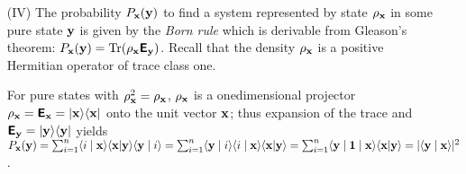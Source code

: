 {\begin{itemize}
{ist, da\ss~ diese zweite Art von Ver\"anderung der $\psi$-Funktion mit
ihrem regelm\"a\ss igen Abrollen {\em zwischen} zwei Messungen nicht das
mindeste zu tun hat. Die abrupte Ver\"anderung durch die Messung
$\ldots$ ist der interessanteste Punkt der ganzen Theorie. Es ist genau
{\em der} Punkt, der den Bruch mit dem naiven Realismus verlangt. Aus
{\em diesem} Grund kann man die $\psi$-Funktion {\em nicht} direkt an
die Stelle des Modells oder des Realdings setzen. Und zwar nicht etwa
weil man einem Realding oder einem Modell nicht abrupte unvorhergesehene
\"Anderungen zumuten d\"urfte, sondern weil vom realistischen Standpunkt
die Beobachtung ein Naturvorgang ist wie jeder andere und nicht per se
eine Unterbrechung des regelm\"a\ss igen Naturlaufs hervorrufen darf.
}



The late Schr\"odinger was much more polemic about these issues; compare for instance his remarks in
his {D}ublin Seminars (1949-1955), published in Ref.
\cite{schroedinger-interpretation}, pages 19-20:
{ ``The idea that  [the alternate measurement outcomes] be not alternatives but {\em all} really happening simultaneously
seems lunatic to [the quantum theorist], just {\em impossible.}
He thinks that if the laws of nature took {\em this} form for,
let me say,
a quarter of an hour, we should find our surroundings rapidly turning into a quagmire, a sort of a featureless jelly or plasma,
all contours becoming blurred, we ourselves probably becoming jelly fish.
It is strange that he should believe this.
For I understand he grants that unobserved nature does behave this way -- namely according to the wave equation.
$\ldots$ according to the quantum theorist, nature is prevented from rapid
jellification only by our perceiving or observing it.''}


\item[(IV)]
The probability $P_{{\bf x}}({\bf y})$ to find a system represented by state ${    \rho}_{\bf x}$
in some pure state ${\bf y}$  is given by  the
{\em Born rule}
which is derivable from Gleason's theorem:
$P_{{\bf x}}({\bf y})=\textrm{Tr} ({    \rho}_{{\bf x}}\textsf{\textbf{E}}_{\bf y})  $.
Recall that   the density ${    \rho}_{{\bf x}}$ is a positive Hermitian operator of trace class one.

For pure states with ${    \rho}_{{\bf x}}^2={    \rho}_{{\bf x}}$, ${    \rho}_{{\bf x}}$ is a onedimensional projector
${    \rho}_{{\bf x}} =  \textsf{\textbf{E}}_{{\bf x}} =\vert {{\bf x}}\rangle \langle {{\bf x}} \vert$
onto the unit vector ${\bf x}$; thus expansion of the trace
and $ \textsf{\textbf{E}}_{{\bf y}} =\vert {{\bf y}}\rangle \langle {{\bf y}} \vert$ yields
$P_{{\bf x}}({\bf y})=
\sum_{i=1}^n \langle i \mid   {{\bf x}}\rangle \langle {{\bf x}} \vert  {\bf y}\rangle \langle {\bf y} \mid  i  \rangle =
\sum_{i=1}^n \langle {\bf y} \mid  i  \rangle \langle i \mid   {{\bf x}}\rangle \langle {{\bf x}} \vert  {\bf y}\rangle =
\sum_{i=1}^n \langle {\bf y} \mid {\bf 1} \mid   {{\bf x}}\rangle \langle {{\bf x}} \vert  {\bf y}\rangle =
\vert \langle {\bf y} \mid {\bf x} \rangle \vert^2 $.



\end{itemize}}
